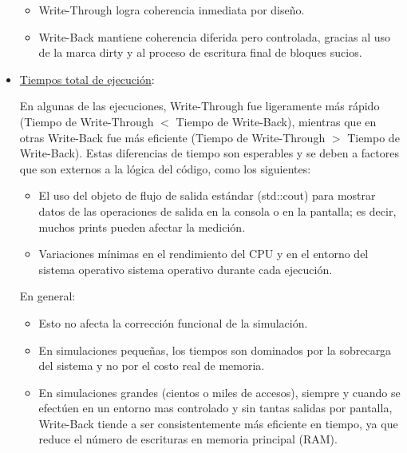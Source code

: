 \documentclass{article}
\begin{document}
\begin{itemize}
\begin{itemize}
        \quad
        
        \item Write-Through logra coherencia inmediata por diseño.
        \item Write-Back mantiene coherencia diferida pero controlada, gracias al uso de la marca dirty y al proceso de escritura final de bloques sucios.
    \end{itemize}

    \quad

    \item  {\underline{Tiempos total de ejecución}:}

    \quad

    {En algunas de las ejecuciones, Write-Through fue ligeramente más rápido (Tiempo de Write-Through $<$ Tiempo de Write-Back), mientras que en otras Write-Back fue más eficiente (Tiempo de Write-Through $>$ Tiempo de Write-Back). Estas diferencias de tiempo son esperables y se deben a factores que son externos a la lógica del código, como los siguientes:}

    \begin{itemize}
        \item El uso del objeto de flujo de salida estándar (std::cout) para mostrar datos de las operaciones de salida en la consola o en la pantalla; es decir, muchos prints pueden afectar la medición.
        \item Variaciones mínimas en el rendimiento del CPU y en el entorno del sistema operativo sistema operativo durante cada ejecución.
    \end{itemize}

    \quad

    En general: 

    \begin{itemize}
        \item Esto no afecta la corrección funcional de la simulación.
        \item En simulaciones pequeñas, los tiempos son dominados por la sobrecarga del sistema y no por el costo real de memoria.
        \item En simulaciones grandes (cientos o miles de accesos), siempre y cuando se efectúen en un entorno mas controlado y sin tantas salidas por pantalla, Write-Back tiende a ser consistentemente más eficiente en tiempo, ya que reduce el número de escrituras en memoria principal (RAM).
    \end{itemize}

    \quad


\end{itemize}
\end{document}
